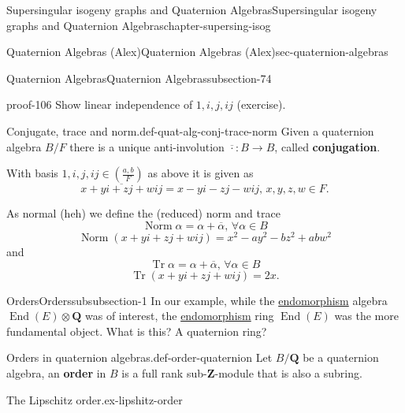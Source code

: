 \documentclass[oneside,10pt,]{book}
\newcommand{\terminology}[1]{\textbf{#1}}
\numberwithin{equation}{section}
\newcommand{\legendre}[2]{\left(\frac{#1}{#2}\right)}
\newcommand{\ZZ}{\mathbf{Z}}
\newcommand{\QQ}{\mathbf{Q}}
\DeclareMathOperator{\End}{End}
\DeclareMathOperator{\norm}{Norm}
\DeclareMathOperator{\trace}{Tr}
\begin{document}
\begin{chapterptx}{Supersingular isogeny graphs and Quaternion Algebras}{}{Supersingular isogeny graphs and Quaternion Algebras}{}{}{chapter-supersing-isog}
\begin{sectionptx}{Quaternion Algebras (Alex)}{}{Quaternion Algebras (Alex)}{}{}{sec-quaternion-algebras}
\begin{subsectionptx}{Quaternion Algebras}{}{Quaternion Algebras}{}{}{subsection-74}
\begin{introduction}{}
\begin{proofptx}{}{proof-106}
Show linear independence of \(1,i,j,ij\) (exercise).%
\end{proofptx}
\begin{definition}{Conjugate, trace and norm.}{def-quat-alg-conj-trace-norm}%
\hypertarget{p-901}{}%
Given a quaternion algebra \(B/F\) there is a unique anti-involution \(\overline \cdot \colon B \to B\), called \terminology{conjugation}.%
\par
\hypertarget{p-902}{}%
With basis \(1,i,j,ij\in \legendre{a,b}{F}\) as above it is given as%
\begin{equation*}
\overline {x + yi + zj + w ij} = x - yi - zj - w ij,\,x,y,z,w\in F\text{.}
\end{equation*}
%
\par
\hypertarget{p-903}{}%
As normal (heh) we define the (reduced) norm and trace%
\begin{equation*}
\norm \alpha =  \alpha + \overline \alpha,\,\forall \alpha \in B
\end{equation*}
%
\begin{equation*}
\norm(x + yi + zj + w ij) = x^2 - ay^2 - b z^2 + ab w^2
\end{equation*}
and%
\begin{equation*}
\trace \alpha =  \alpha + \overline \alpha,\,\forall \alpha \in B
\end{equation*}
%
\begin{equation*}
\trace (x + yi + zj + w ij) = 2x\text{.}
\end{equation*}
%
\end{definition}
\end{introduction}%
%
%
\typeout{************************************************}
\typeout{************************************************}
%
\begin{subsubsectionptx}{Orders}{}{Orders}{}{}{subsubsection-1}
\hypertarget{p-904}{}%
In our example, while the \hyperref[def-supersing-isog-endo]{endomorphism} algebra \(\End(E)\otimes \QQ\) was of interest, the \hyperref[def-supersing-isog-endo]{endomorphism} ring \(\End(E)\) was the more fundamental object. What is this? A quaternion ring?%
\begin{definition}{Orders in quaternion algebras.}{def-order-quaternion}%
\hypertarget{p-905}{}%
Let \(B/\QQ\) be a quaternion algebra, an \terminology{order} in \(B\) is a full rank sub-\(\ZZ\)-module that is also a subring.%
\end{definition}
\begin{example}{The Lipschitz order.}{ex-lipshitz-order}%

\end{example}
\end{subsubsectionptx}
\end{subsectionptx}
\end{sectionptx}
\end{chapterptx}
\end{document}

